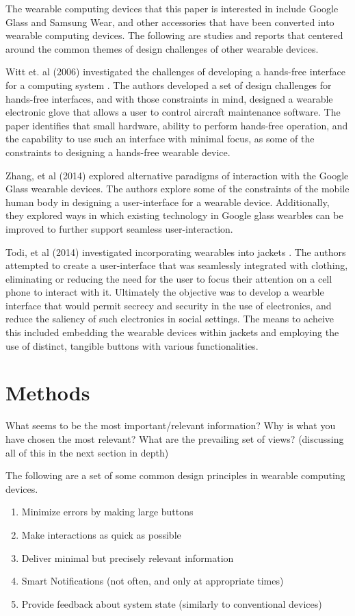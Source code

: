 \documentclass[12pt]{article}
\begin{document}
The wearable computing devices that this paper is interested in include Google Glass and Samsung Wear, and other accessories that have been converted into wearable computing devices. The following are studies and reports that centered around the common themes of design challenges of other wearable devices.

Witt et. al (2006) investigated the challenges of developing a hands-free interface for a computing system \cite{witt}. The authors developed a set of design challenges for hands-free interfaces, and with those constraints in mind, designed a wearable electronic glove that allows a user to control aircraft maintenance software. The paper identifies that small hardware, ability to perform hands-free operation, and the capability to use such an interface with minimal focus, as some of the constraints to designing a hands-free wearable device.

Zhang, et al (2014) explored alternative paradigms of interaction with the Google Glass wearable devices. The authors explore some of the constraints of the mobile human body in designing a user-interface for a wearable device. Additionally, they explored ways in which existing technology in Google glass wearbles can be improved to further support seamless user-interaction. 

Todi, et al (2014) investigated incorporating wearables into jackets \cite{todi}. The authors attempted to create a user-interface that was seamlessly integrated with clothing, eliminating or reducing the need for the user to focus their attention on a cell phone to interact with it. Ultimately the objective was to develop a wearble interface that would permit secrecy and security in the use of electronics, and reduce the saliency of such electronics in social settings.  The means to acheive this included embedding the wearable devices within jackets and employing the use of distinct, tangible buttons with various functionalities.

\section{Methods} 
What seems to be the most important/relevant information? Why is what you have chosen the most relevant? What are the prevailing set of views? (discussing all of this in the next section in depth) 

The following are a set of some common design principles in wearable computing devices.

\begin{enumerate}
\item{Minimize errors by making large buttons}
\item{Make interactions as quick as possible}
\item{Deliver minimal but precisely relevant information}
\item{Smart Notifications (not often, and only at appropriate times)}
\item{Provide feedback about system state (similarly to conventional devices)}
\end{enumerate}
\end{document}
